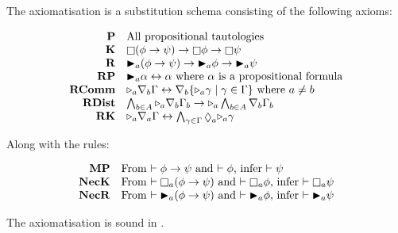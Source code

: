 \begin{definition}[\axiomKF]
The axiomatisation \axiomKF{} is a substitution schema consisting of the
following axioms:

$$
\begin{array}{rl}
{\bf P} & \text{All propositional tautologies}\\
{\bf K} & \knows (\phi \implies \psi) \implies \knows \phi \implies \knows
\psi\\
{\bf R} & \allrefs_a (\phi \implies \psi) \implies \allrefs_a \phi \implies
\allrefs_a \psi\\
{\bf RP} & \allrefs_a \alpha \iff \alpha \text{ where $\alpha$ is a
propositional formula}\\
{\bf RComm} & \somerefs_a \covers_b \Gamma \iff \covers_b \{\somerefs_a \gamma
\mid \gamma \in \Gamma\} \text{ where $a \neq b$}\\
{\bf RDist} & \bigwedge_{b \in A} \somerefs_a \covers_b \Gamma_b \implies
\somerefs_a \bigwedge_{b \in A} \covers_b \Gamma_b\\
{\bf RK} & \somerefs_a \covers_a \Gamma \iff \bigwedge_{\gamma \in \Gamma}
\suspects_a \somerefs_a \gamma\\
\end{array}
$$

Along with the rules:

$$
\begin{array}{rl}
{\bf MP} & \text{From $\proves \phi \implies \psi$ and $\proves \phi$, infer
$\proves \psi$}\\
{\bf NecK} & \text{From $\proves \knows_a (\phi \implies \psi)$ and $\proves
\knows_a \phi$, infer $\proves \knows_a \psi$}\\
{\bf NecR} & \text{From $\proves \allrefs_a (\phi \implies \psi)$ and $\proves
\allrefs_a \phi$, infer $\proves \allrefs_a \psi$}
\end{array}
$$
\end{definition}

\begin{lemma}\label{k-sound}
The axiomatisation \axiomKF{} is sound in \logicKF{}.
\end{lemma}

